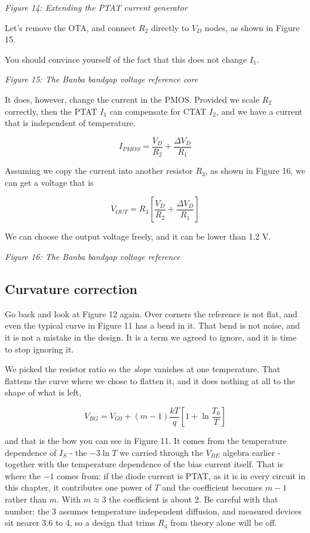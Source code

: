 {
\centering
{}
}

\emph{Figure 14: Extending the PTAT current generator }

Let's remove the OTA, and connect \(R_2\) directly to \(V_D\) nodes, as
shown in Figure 15.

You should convince yourself of the fact that this does not change
\(I_1\).


{
\centering
{}
}

\emph{Figure 15: The Banba bandgap voltage reference core }

It does, however, change the current in the PMOS. Provided we scale
\(R_2\) correctly, then the PTAT \(I_1\) can compensate for CTAT
\(I_2\), and we have a current that is independent of temperature.

\[ I_{PMOS} = \frac{V_D}{R_2} + \frac{\Delta V_D}{R_1}\]

Assuming we copy the current into another resistor \(R_3\), as shown in
Figure 16, we can get a voltage that is

\[ V_{OUT} = R_3\left[\frac{V_D}{R_2} + \frac{\Delta V_D}{R_1}\right]\]

We can choose the output voltage freely, and it can be lower than 1.2 V.


{
\centering
{}
}

\emph{Figure 16: The Banba bandgap voltage reference }

\subsection{Curvature correction}\label{curvature-correction}

Go back and look at Figure 12 again. Over corners the reference is not
flat, and even the typical curve in Figure 11 has a bend in it. That
bend is not noise, and it is not a mistake in the design. It is a term
we agreed to ignore, and it is time to stop ignoring it.

We picked the resistor ratio so the \emph{slope} vanishes at one
temperature. That flattens the curve where we chose to flatten it, and
it does nothing at all to the shape of what is left,

\[ V_{BG} = V_{G0} + (m-1)\frac{kT}{q}\left[1 + \ln{\frac{T_0}{T}}\right] \]

and that is the bow you can see in Figure 11. It comes from the
temperature dependence of \(I_S\) - the \(-3\ln{T}\) we carried through
the \(V_{BE}\) algebra earlier - together with the temperature
dependence of the bias current itself. That is where the \(-1\) comes
from: if the diode current is PTAT, as it is in every circuit in this
chapter, it contributes one power of \(T\) and the coefficient becomes
\(m-1\) rather than \(m\). With \(m \approx 3\) the coefficient is about
2. Be careful with that number: the \(3\) assumes temperature
independent diffusion, and measured devices sit nearer 3.6 to 4, so a
design that trims \(R_4\) from theory alone will be off.

